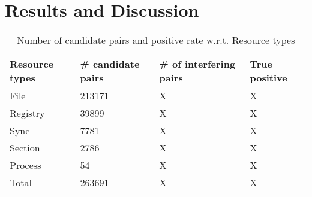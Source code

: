 \chapter{Results and Discussion}
\label{cha:Results and Discussion}
\begin{table}[htsb]
  \caption[]{Number of candidate pairs and positive rate w.r.t. Resource types}\label{tab:routers}
  \centering
  \begin{tabular}{l l l l}
    \toprule
    Resource types & \# candidate pairs& \# of interfering pairs & True positive \\
    \midrule
    File & 213171 & X & X \\
    Registry & 39899 & X & X \\
    Sync & 7781 & X & X \\
    Section & 2786 & X & X \\
    Process & 54 & X & X \\
    \bottomrule
    Total & 263691 & X & X \\
  \end{tabular}
\end{table}

